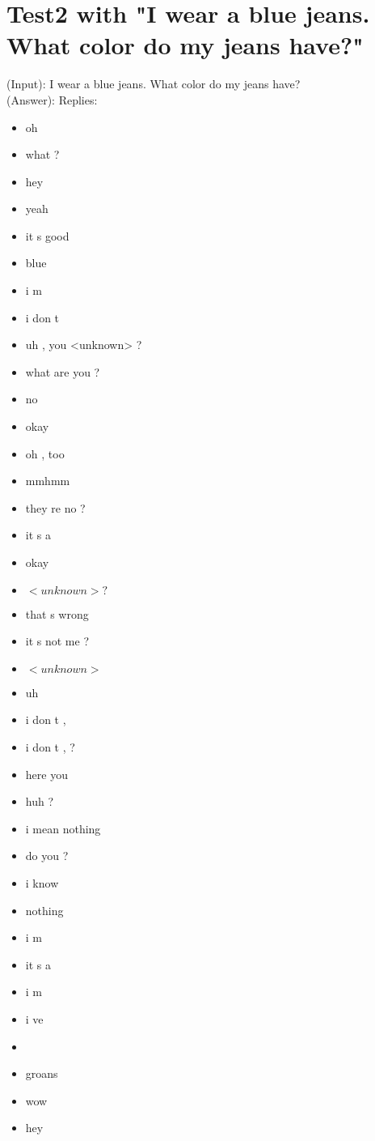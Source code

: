 \section{Test2 with "I wear a blue jeans. What color do my jeans have?"}
\label{apendix:result2:Beam-search-200:OpenSubtitle}
(Input): I wear a blue jeans. What color do my jeans have?\\
(Answer): Replies:
\begin{multicols}{2}
	\begin{itemize}
		\item oh
		\item what ?
		\item hey
		\item yeah
		\item it s good
		\item blue
		\item i m
		\item i don t
		\item uh , you <unknown> ?
		\item what are you ?
		\item no
		\item okay
		\item oh , too
		\item mmhmm
		\item they re no ?
		\item it s a
		\item okay
		\item $<unknown> ?$
		\item that s wrong
		\item it s not me ?
		\item $<unknown>$
		\item uh
		\item i don t ,
		\item i don t , ?
		\item here you
		\item huh ?
		\item i mean nothing
		\item do you ?
		\item i know
		\item nothing
		\item i m
		\item it s a
		\item i m
		\item i ve
		\item
		\item groans
		\item wow
		\item hey

\end{itemize}
\end{multicols}
